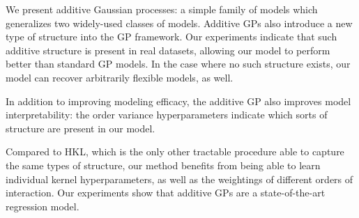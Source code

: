 We present additive Gaussian processes: a simple family of models which generalizes two widely-used classes of models.  Additive GPs also introduce a new type of structure into the GP framework.   Our experiments indicate that such additive structure is present in real datasets, allowing our model to perform better than standard GP models.  In the case where no such structure exists, our model can recover arbitrarily flexible models, as well.

In addition to improving modeling efficacy, the additive GP also improves model interpretability:  the order variance hyperparameters indicate which sorts of structure are present in our model.

Compared to HKL, which is the only other tractable procedure able to capture the same types of structure, our method benefits from being able to learn individual kernel hyperparameters, as well as the weightings of different orders of interaction.  Our experiments show that additive GPs are a state-of-the-art regression model.





